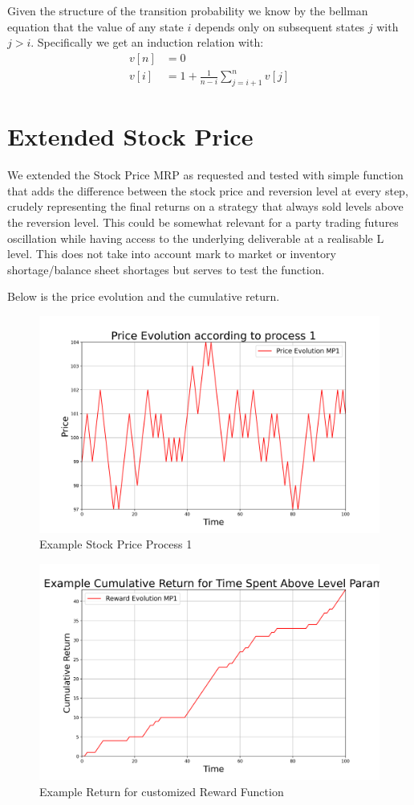 \documentclass{article}[12pt]
\begin{document}
Given the structure of the transition probability we know by the bellman equation that the value of any state $i$ depends only on subsequent states $j$ with $j>i$. Specifically we get an induction relation with:
\begin{align*}
v[n] &= 0\\
v[i] &= 1 + \frac{1}{n-i}\sum_{j = i+1}^n v[j]
\end{align*}


\section{Extended Stock Price}

We extended the Stock Price MRP as requested and tested with simple function that adds the difference between the stock price and reversion level at every step, crudely representing the final returns on a strategy that always sold levels above the reversion level. This could be somewhat relevant for a party trading futures oscillation while having access to the underlying deliverable at a realisable L level. This does not take into account mark to market or inventory shortage/balance sheet shortages but serves to test the function.

Below is the price evolution and the cumulative return.


\begin{figure}
  \includegraphics[width=\linewidth]{ex_price.png}
  \caption{Example Stock Price Process 1}
  \label{fig:rollDist}
\end{figure}

\begin{figure}
  \includegraphics[width=\linewidth]{ex_rew.png}
  \caption{Example Return for customized Reward Function}
  \label{fig:term_out}
\end{figure}
\end{document}
